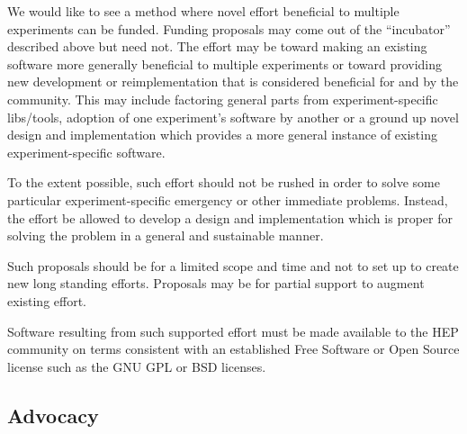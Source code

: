 We would like to see a method where novel effort beneficial to 
multiple experiments can be funded.
Funding proposals may come out of the ``incubator'' described above but need not.
The effort may be toward making an existing software more generally
beneficial to multiple experiments
or toward providing new development or reimplementation that is 
considered beneficial for and by the community.  This may include factoring
general parts from experiment-specific libs/tools, adoption of one
experiment's software by another or a ground up novel design and
implementation which provides a more general instance of existing
experiment-specific software.

To the extent possible, such effort should not be rushed in order to solve
some particular experiment-specific emergency or other immediate problems.  
Instead, the effort be allowed to develop a design and implementation which 
is proper for solving the problem in a general and sustainable manner.

Such proposals should be for a limited scope and time and not to set
up to create new long standing efforts.  Proposals may be for partial
support to augment existing effort.

Software resulting from such supported effort must be made available
to the HEP community on terms consistent with an  established
Free Software or Open Source license such as the GNU GPL or BSD licenses.

\subsection{Advocacy}


